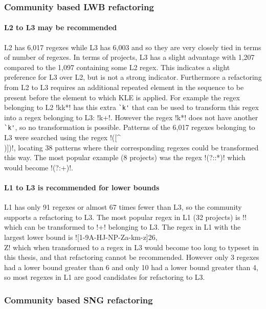 \subsubsection{Community based LWB refactoring}
\paragraph{L2 to L3 may be recommended} L2 has 6,017 regexes while L3 has 6,003 and so they are very closely tied in terms of number of regexes.  In terms of projects, L3 has a slight advantage with 1,207 compared to the 1,097 containing some L2 regex.  This indicates a slight preference for L3 over L2, but is not a strong indicator.  Furthermore a refactoring from L2 to L3 requires an additional repeated element in the sequence to be present before the element to which KLE is applied.  For example the regex belonging to L2 \cverb!kk*! has this extra \verb!`k'! that can be used to transform this regex into a regex belonging to L3: \cverb!k+!.  However the regex \cverb!k*! does not have another \verb!`k'!, so no transformation is possible.  Patterns of the 6,017 regexes belonging to L3 were searched using the regex \cverb!([^\\)\]])\1\*!, locating 38 patterns where their corresponding regexes could be transformed this way.  The most popular example (8 projects) was the regex \cverb!(?::*)! which would become \cverb!(?:+)!.

\paragraph{L1 to L3 is recommended for lower bounds}  L1 has only 91 regexes or almost 67 times fewer than L3, so the community supports a refactoring to L3.  The most popular regex in L1 (32 projects) is \cverb!! which can be transformed to \cverb!\n\n+! belonging to L3.  The regex in L1 with the largest lower bound is \cverb![1-9A-HJ-NP-Za-km-z]{26,}\\Z! which when transformed to a regex in L3 would become too long to typeset in this thesis, and that refactoring cannot be recommended.  However only 3 regexes had a lower bound greater than 6 and only 10 had a lower bound greater than 4, so most regexes in L1 are good candidates for refactoring to L3.

\subsubsection{Community based SNG refactoring}
